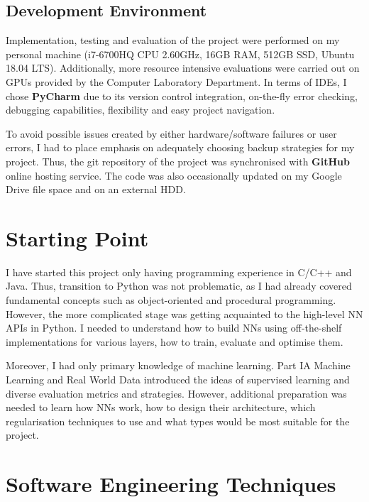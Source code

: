 \subsection{Development Environment}

Implementation, testing and evaluation of the project were performed on my personal machine (i7-6700HQ CPU 2.60GHz, 16GB RAM, 512GB SSD,  Ubuntu 18.04 LTS). Additionally, more resource intensive evaluations were carried out on GPUs provided by the Computer Laboratory Department. In terms of IDEs, I chose \textbf{PyCharm} due to its version control integration, on-the-fly error checking, debugging capabilities, flexibility and easy project navigation. \smallskip

To avoid possible issues created by either hardware/software failures or user errors, I had to place emphasis on adequately choosing backup strategies for my project. Thus, the git repository of the project was synchronised with \textbf{GitHub} online hosting service. The code was also occasionally updated on my Google Drive file space and on an external HDD. \\

\section{Starting Point}

I have started this project only having programming experience in C/C++ and Java. Thus, transition to Python was not problematic, as I had already covered fundamental concepts such as object-oriented and procedural programming. However, the more complicated stage was getting acquainted to the high-level NN APIs in Python. I needed to understand how to build NNs using off-the-shelf implementations for various layers, how to train, evaluate and optimise them. \smallskip

Moreover, I had only primary knowledge of machine learning. Part IA Machine Learning and Real World Data introduced the ideas of supervised learning and diverse evaluation metrics and strategies. However, additional preparation was needed to learn how NNs work, how to design their architecture, which regularisation techniques to use and what types would be most suitable for the project. \\

\section{Software Engineering Techniques}

